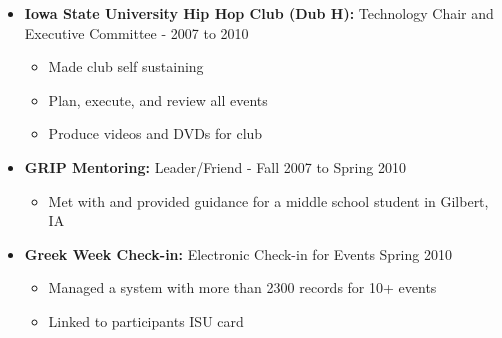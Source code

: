 \documentclass[oneside]{article}
\begin{document}
\begin{itemize}

\item{\bf Iowa State University Hip Hop Club (Dub H):} Technology Chair and Executive Committee - 2007 to 2010
\begin{itemize}
  \item Made club self sustaining
  \item Plan, execute, and review all events
  \item Produce videos and DVDs for club
\end{itemize}

\item{\bf GRIP Mentoring:} Leader/Friend - Fall 2007 to Spring 2010
\begin{itemize}
  \item Met with and provided guidance for a middle school student in Gilbert, IA
\end{itemize}

\item{\bf Greek Week Check-in:} Electronic Check-in for Events Spring 2010
\begin{itemize}
  \item Managed a system with more than 2300 records for 10+ events
  \item Linked to participants ISU card
\end{itemize}


\end{itemize}
\end{document}
